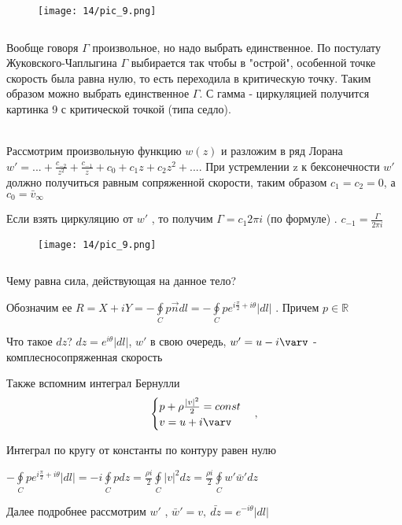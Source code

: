 \begin{wrapfigure}{l}{0.15\textwidth}
	\texttt{[image: 14/pic\_9.png]}
	\caption{\label{ris:image14.9}}
\end{wrapfigure}
$$ $$

Вообще говоря $\Gamma$ произвольное, но надо выбрать единственное. По постулату Жуковского-Чаплыгина $\Gamma$ выбирается так чтобы в "острой", особенной точке скорость была равна нулю, то есть переходила в критическую точку. Таким образом можно выбрать единственное $\Gamma$. С гамма - циркуляцией получится картинка 9 с критической точкой (типа седло).

\newpage
\\

Рассмотрим произвольную функцию $w(z)$ и разложим в ряд Лорана $w' = ... + \frac{c_{-2}}{z^2} + \frac{c_{-1}}{z} + c_0 + c_1 z + c_2 z^2 + ... $. При устремлении z к бексонечности $w'$ должно получиться равным сопряженной скорости, таким образом $c_1 = c_2 = 0$, а $c_0 = \bar{v}_{\infty}$

Если взять циркуляцию от $w'$ , то получим $\Gamma = c_1 2 \pi i $ (по формуле) . $c_{-1} = \frac{\Gamma}{2 \pi i}$

\begin{wrapfigure}{r}{0.15\textwidth}
	\texttt{[image: 14/pic\_9.png]}
	\caption{\label{ris:image14.10}}
\end{wrapfigure}
$$ $$

Чему равна сила, действующая на данное тело? 

Обозначим ее $R = X + i Y = - 	\oint \limits_{C} p \overrightarrow{n} dl = - \oint \limits_{C} p e^{i\frac{\pi}{2} + i\theta} |dl|$ . Причем $p \in \mathbb{R}$

Что такое $dz$? $dz = e^{i \theta} |dl |$, $w'$  в свою очередь, $w' = u -i \varv$ -  комплесносопряженная скорость 

Также вспомним интеграл Бернулли
$$ \begin{cases}
	p + \rho \frac{|v|^2}{2} = const \\
	v = u + i \varv
\end{cases},$$

Интеграл по кругу от константы по контуру равен нулю 

$- \oint \limits_{C} p e^{i\frac{\pi}{2} + i\theta} |dl| = -i \oint  \limits_{C} p dz = \frac{\rho i}{2} \oint  \limits_{C} |v|^2 dz =  \frac{\rho i}{2} \oint  \limits_{C} w' \bar{w}' d z$

Далее подробнее рассмотрим $w'$ , $\bar{w}' = v, \ \bar{dz} = e^{-i \theta} |dl|$

